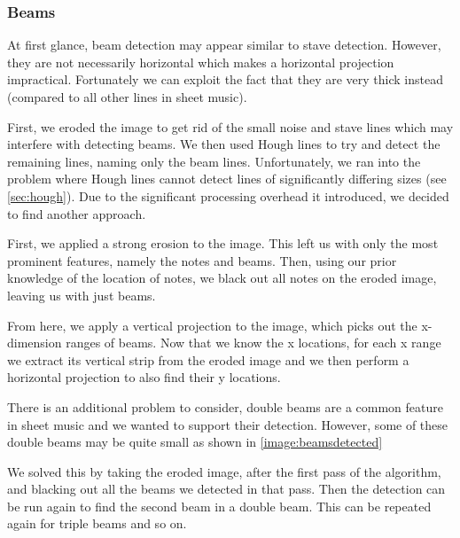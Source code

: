 \subsubsection{Beams}

At first glance, beam detection may appear similar to stave detection. However, they are not necessarily horizontal which makes a horizontal projection impractical. Fortunately we can exploit the fact that they are very thick instead (compared to all other lines in sheet music).

First, we eroded the image to get rid of the small noise and stave lines which may interfere with detecting beams. We then used Hough lines to try and detect the remaining lines, naming only the beam lines. Unfortunately, we ran into the problem where Hough lines cannot detect lines of significantly differing sizes (see \autoref{sec:hough}). Due to the significant processing overhead it introduced, we decided to find another approach.

First, we applied a strong erosion to the image. This left us with only the most prominent features, namely the notes and beams. Then, using our prior knowledge of the location of notes, we black out all notes on the eroded image, leaving us with just beams.

From here, we apply a vertical projection to the image, which picks out the x-dimension ranges of beams. Now that we know the x locations, for each x range we extract its vertical strip from the eroded image and we then perform a horizontal projection to also find their y locations.

There is an additional problem to consider, double beams are a common feature in sheet music and we wanted to support their detection. However, some of these double beams may be quite small as shown in \ref{image:beamsdetected} 


We solved this by taking the eroded image, after the first pass of the algorithm, and blacking out all the beams we detected in that pass. Then the detection can be run again to find the second beam in a double beam. This can be repeated again for triple beams and so on.


